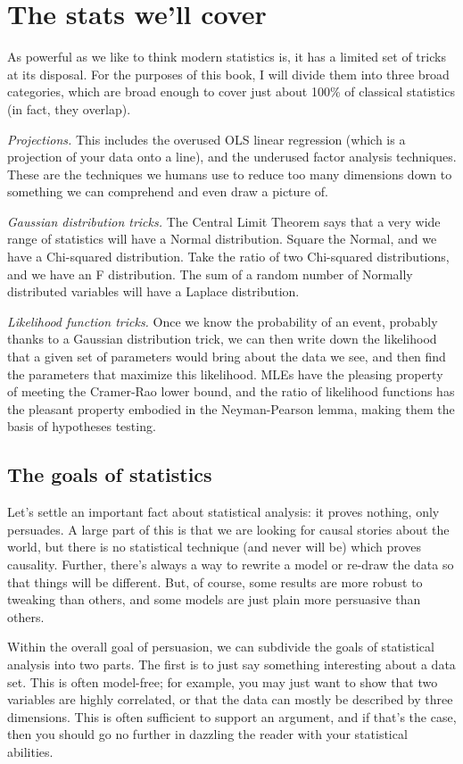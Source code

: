 \documentclass[12pt,notitlepage, openany]{book}
\begin{document}
\section{The stats we'll cover} 
As powerful as we like to think modern statistics is, it has a 
limited set of tricks at its disposal. For the purposes of this book,
I will divide them into three broad categories, which are broad enough
to cover just about 100\% of classical statistics (in fact, they overlap).

{\it Projections.} This includes the overused OLS linear regression (which is
a projection of your data onto a line), and the underused factor analysis
techniques. These are the techniques we humans use to reduce too many
dimensions down to something we can comprehend and even draw a picture of.

{\it Gaussian distribution tricks.} The Central Limit Theorem says that
a very wide range of statistics will have a Normal distribution. Square
the Normal, and we have a Chi-squared distribution. Take the ratio of two
Chi-squared distributions, and we have an F distribution.  The sum of
a random number of Normally distributed variables will have a Laplace
distribution.

{\it Likelihood function tricks.} Once we know the probability of an
event, probably thanks to a Gaussian distribution trick, we can then
write down the likelihood that a given set of parameters would bring
about the data we see, and then find the parameters that maximize this
likelihood. MLEs have the pleasing property of meeting the Cramer-Rao
lower bound, and the ratio of likelihood functions has the pleasant
property embodied in the Neyman-Pearson lemma, making them the basis of
hypotheses testing.

\subsection{The goals of statistics} Let's settle an
important fact about statistical analysis: it proves nothing, only
persuades. A large part of this is that we are looking for causal stories
about the world, but there is no statistical technique (and never will be)
which proves causality. Further, there's always a way to rewrite a model
or re-draw the data so that things will be different. But, of course,
some results are more robust to tweaking 
than others, and some models are just plain more persuasive than others.

Within the overall goal of persuasion, we can subdivide the goals of
statistical analysis into two parts. The first is to just say something
interesting about a data set. This is often model-free; for example,
you may just want to show that two variables are highly correlated, or
that the data can mostly be described by three dimensions. This is often
sufficient to support an argument, and if that's the case, then you should
go no further in dazzling the reader with your statistical abilities.
\end{document}
